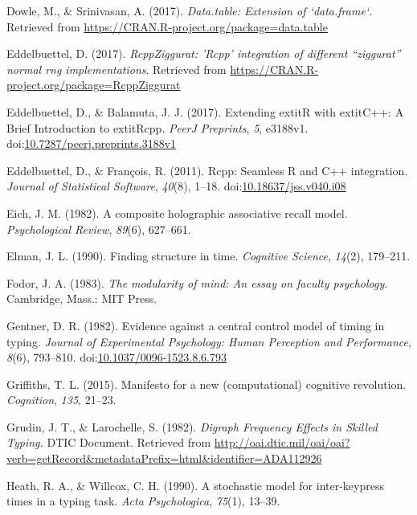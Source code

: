 \documentclass[floatsintext,man]{apa6}
\theoremstyle{definition}
\theoremstyle{definition}
\theoremstyle{definition}
\theoremstyle{remark}
\begin{document}
\hypertarget{ref-R-data.table}{}
Dowle, M., \& Srinivasan, A. (2017). \emph{Data.table: Extension of
`data.frame`}. Retrieved from
\url{https://CRAN.R-project.org/package=data.table}

\hypertarget{ref-R-RcppZiggurat}{}
Eddelbuettel, D. (2017). \emph{RcppZiggurat: 'Rcpp' integration of
different ``ziggurat'' normal rng implementations}. Retrieved from
\url{https://CRAN.R-project.org/package=RcppZiggurat}

\hypertarget{ref-R-Rcpp_b}{}
Eddelbuettel, D., \& Balamuta, J. J. (2017). Extending extitR with
extitC++: A Brief Introduction to extitRcpp. \emph{PeerJ Preprints},
\emph{5}, e3188v1.
doi:\href{https://doi.org/10.7287/peerj.preprints.3188v1}{10.7287/peerj.preprints.3188v1}

\hypertarget{ref-R-Rcpp_a}{}
Eddelbuettel, D., \& François, R. (2011). Rcpp: Seamless R and C++
integration. \emph{Journal of Statistical Software}, \emph{40}(8),
1--18.
doi:\href{https://doi.org/10.18637/jss.v040.i08}{10.18637/jss.v040.i08}

\hypertarget{ref-eich_composite_1982}{}
Eich, J. M. (1982). A composite holographic associative recall model.
\emph{Psychological Review}, \emph{89}(6), 627--661.

\hypertarget{ref-elman_finding_1990}{}
Elman, J. L. (1990). Finding structure in time. \emph{Cognitive
Science}, \emph{14}(2), 179--211.

\hypertarget{ref-fodor_modularity_1983}{}
Fodor, J. A. (1983). \emph{The modularity of mind: An essay on faculty
psychology}. Cambridge, Mass.: MIT Press.

\hypertarget{ref-GentnerEvidencecentralcontrol1982}{}
Gentner, D. R. (1982). Evidence against a central control model of
timing in typing. \emph{Journal of Experimental Psychology: Human
Perception and Performance}, \emph{8}(6), 793--810.
doi:\href{https://doi.org/10.1037/0096-1523.8.6.793}{10.1037/0096-1523.8.6.793}

\hypertarget{ref-griffiths_manifesto_2015}{}
Griffiths, T. L. (2015). Manifesto for a new (computational) cognitive
revolution. \emph{Cognition}, \emph{135}, 21--23.

\hypertarget{ref-grudin_digraph_1982}{}
Grudin, J. T., \& Larochelle, S. (1982). \emph{Digraph Frequency Effects
in Skilled Typing.} DTIC Document. Retrieved from
\url{http://oai.dtic.mil/oai/oai?verb=getRecord\&metadataPrefix=html\&identifier=ADA112926}

\hypertarget{ref-heath_stochastic_1990}{}
Heath, R. A., \& Willcox, C. H. (1990). A stochastic model for
inter-keypress times in a typing task. \emph{Acta Psychologica},
\emph{75}(1), 13--39.
\end{document}

